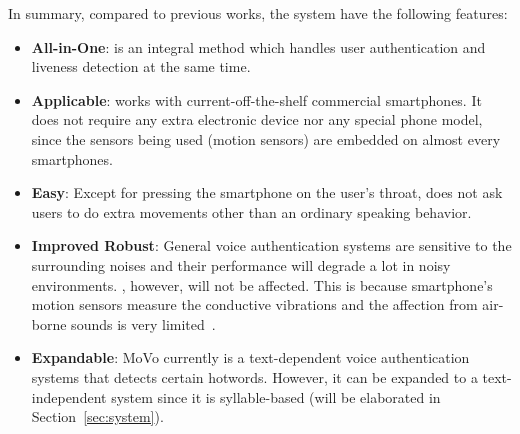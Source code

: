 

In summary, compared to previous works, the {\shortname} system have the following features:
\begin{itemize}
	\item  \textbf{All-in-One}: {\shortname} is an integral method which handles user authentication and liveness detection at the same time.
	
	\item  \textbf{Applicable}: {\shortname} works with current-off-the-shelf commercial smartphones. It does not require any extra electronic device nor any special phone model, since the sensors being used (motion sensors) are embedded on almost every smartphones.
	
	\item \textbf{Easy}: Except for pressing the smartphone on the user’s throat, {\shortname} does not ask users to do extra movements other than an ordinary speaking behavior.  
	
	\item \textbf{Improved Robust}: General voice authentication systems are sensitive to the surrounding noises and their performance will degrade a lot in noisy environments. {\shortname}, however, will not be affected. This is because smartphone's motion sensors measure the conductive vibrations and the  affection from air-borne sounds is very limited~\cite{anand2018speechless}.

%	
	
	\item \textbf{Expandable}: MoVo currently is a  text-dependent voice authentication systems that detects certain hotwords. However, it can be expanded to a text-independent system since it is syllable-based (will be elaborated in Section~\ref{sec:system}).
	
	
\end{itemize}




